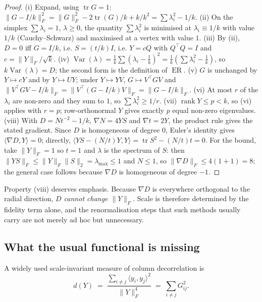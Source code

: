 \documentclass[11pt]{article}
\theoremstyle{definition}
\DeclareMathOperator{\tr}{tr}
\DeclareMathOperator{\Var}{Var}
\DeclareMathOperator{\ER}{ER}
\newcommand{\norm}[1]{\lVert #1 \rVert}
\newcommand{\Fnorm}[1]{\lVert #1 \rVert_F}
\newcommand{\ip}[2]{\langle #1, #2 \rangle}
\begin{document}
\begin{proof}
(i) Expand, using $\tr G = 1$: $\Fnorm{G - I/k}^2 = \Fnorm{G}^2 - 2\tr(G)/k +
k/k^2 = \sum\lambda_i^2 - 1/k$.
(ii) On the simplex $\sum\lambda_i=1$, $\lambda\ge0$, the quantity
$\sum\lambda_i^2$ is minimised at $\lambda_i \equiv 1/k$ with value $1/k$
(Cauchy--Schwarz) and maximised at a vertex with value $1$.
(iii) By (ii), $D=0$ iff $G = I/k$, i.e. $S = (t/k)I$, i.e. $Y = cQ$ with
$Q^\top Q=I$ and $c = \Fnorm{Y}/\sqrt{k}$.
(iv) $\Var(\lambda) = \frac1k\sum(\lambda_i - \frac1k)^2 =
\frac1k(\sum\lambda_i^2 - \frac1k)$, so $k\Var(\lambda) = D$; the second form is
the definition of $\ER$.
(v) $G$ is unchanged by $Y\mapsto cY$ and by $Y \mapsto UY$; under
$Y \mapsto YV$, $G \mapsto V^\top G V$ and
$\Fnorm{V^\top G V - I/k} = \Fnorm{V^\top(G-I/k)V} = \Fnorm{G-I/k}$.
(vi) At most $r$ of the $\lambda_i$ are non-zero and they sum to $1$, so
$\sum\lambda_i^2 \ge 1/r$.
(vii) $\operatorname{rank}Y \le p < k$, so (vi) applies with $r=p$; row-orthonormal
$Y$ gives exactly $p$ equal non-zero eigenvalues.
(viii) With $D = N t^{-2} - 1/k$, $\nabla N = 4YS$ and $\nabla t = 2Y$, the
product rule gives the stated gradient. Since $D$ is homogeneous of degree $0$,
Euler's identity gives $\ip{\nabla D}{Y} = 0$; directly,
$\ip{YS - (N/t)Y}{Y} = \tr S^2 - (N/t)t = 0$. For the bound, take
$\Fnorm{Y}=1$ so $t=1$ and $\lambda$ is the spectrum of $S$: then
$\Fnorm{YS} \le \Fnorm{Y}\norm{S}_2 = \lambda_{\max} \le 1$ and $N \le 1$, so
$\Fnorm{\nabla D} \le 4(1+1) = 8$; the general case follows because $\nabla D$ is
homogeneous of degree $-1$.
\end{proof}

Property (viii) deserves emphasis. Because $\nabla D$ is everywhere orthogonal to
the radial direction, \emph{$D$ cannot change $\Fnorm{Y}$}. Scale is therefore
determined by the fidelity term alone, and the renormalisation steps that such
methods usually carry are not merely ad hoc but unnecessary.

\subsection{What the usual functional is missing}

A widely used scale-invariant measure of column decorrelation is
\begin{equation}\label{eq:old}
  d(Y) \;=\; \frac{\sum_{i\ne j}\ip{y_i}{y_j}^2}{\Fnorm{Y}^4}
        \;=\; \sum_{i\ne j} G_{ij}^2 .
\end{equation}
\end{document}
